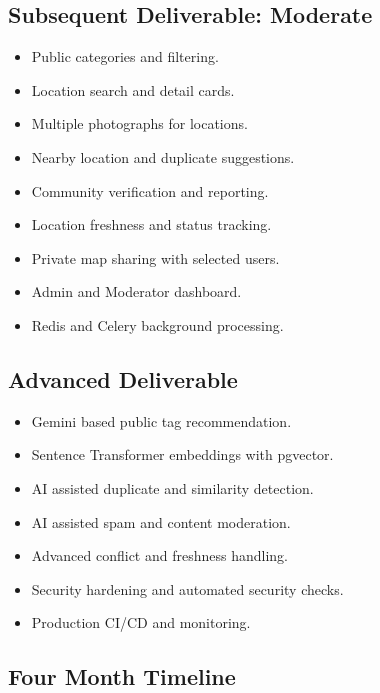 \documentclass[11pt,a4paper]{article}
\begin{document}
\subsection{Subsequent Deliverable: Moderate}

\begin{itemize}[leftmargin=0.7cm]
    \item Public categories and filtering.
    \item Location search and detail cards.
    \item Multiple photographs for locations.
    \item Nearby location and duplicate suggestions.
    \item Community verification and reporting.
    \item Location freshness and status tracking.
    \item Private map sharing with selected users.
    \item Admin and Moderator dashboard.
    \item Redis and Celery background processing.
\end{itemize}

\subsection{Advanced Deliverable}

\begin{itemize}[leftmargin=0.7cm]
    \item Gemini based public tag recommendation.
    \item Sentence Transformer embeddings with pgvector.
    \item AI assisted duplicate and similarity detection.
    \item AI assisted spam and content moderation.
    \item Advanced conflict and freshness handling.
    \item Security hardening and automated security checks.
    \item Production CI/CD and monitoring.
\end{itemize}

\subsection{Four Month Timeline}
\end{document}
